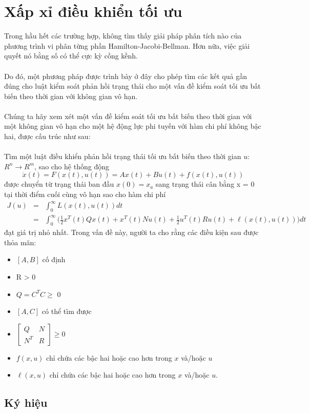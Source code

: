 \documentclass[12pt,a4paper]{report}
\begin{document}
\section{Xấp xỉ điều khiển tối ưu}
Trong hầu hết các trường hợp, không tìm thấy giải pháp phân tích nào của phương trình vi phân từng phần Hamilton-Jacobi-Bellman. Hơn nữa, việc giải quyết nó bằng số có thể cực kỳ cồng kềnh.\\\\
Do đó, một phương pháp được trình bày ở đây cho phép tìm các kết quả gần đúng cho luật kiểm soát phản hồi trạng thái cho một vấn đề kiểm soát tối ưu bất biến theo thời gian với không gian vô hạn.\\\\ Chúng ta hãy xem xét một vấn đề kiểm soát tối ưu bất biến theo thời gian với một không gian vô hạn cho một hệ động lực phi tuyến với hàm chi phí không bậc hai, được cấu trúc như sau: \\\\ Tìm một luật điều khiển phản hồi trạng thái tối ưu bất biến theo thời gian $u$: $R^n \to R^m$, sao cho hệ thống động $$\dot{x}(t) = F(x(t), u(t)) = Ax(t) + Bu(t) + f(x(t), u(t))$$ được chuyển từ trạng thái ban đầu $x(0) = x_a$ sang trạng thái cân bằng x = 0 tại thời điểm cuối cùng vô hạn sao cho hàm chi phí \begin{eqnarray}
	J(u) &=& \int_{0}^{\infty}L(x(t), u(t))dt \nonumber \\
	&=& \int_{0}^{\infty}\Big(\frac{1}{2}x^T(t)Qx(t) + x^T(t)Nu(t) + \frac{1}{2}u^T(t)Ru(t) + \ell(x(t), u(t)) \Big)dt \nonumber 
\end{eqnarray} đạt giá trị nhỏ nhất.
Trong vấn đề này, người ta cho rằng các điều kiện sau được thỏa mãn: \begin{itemize}
	\item $[A, B]$ cố định
	\item R > 0
	\item $Q = C^TC \geq$ 0
	\item $[A, C]$ có thể tìm được
	\item $\begin{bmatrix}
	Q&N\\N^T&R
	\end{bmatrix} \geq 0$
	\item $f(x, u)$ chỉ chứa các bậc hai hoặc cao hơn trong $x$ và/hoặc $u$
	\item $\ell(x, u)$ chỉ chứa các bậc hai hoặc cao hơn trong $x$ và/hoặc $u$.
\end{itemize}
\subsection{Ký hiệu}
\end{document}
